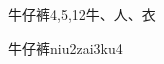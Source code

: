 \begin{entry}{牛仔裤}{4,5,12}{⽜、⼈、⾐}
  \begin{phonetics}{牛仔裤}{niu2zai3ku4}
  \end{phonetics}
\end{entry}
